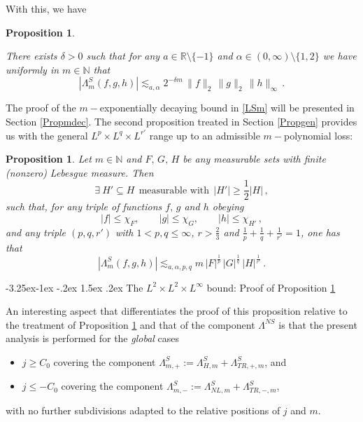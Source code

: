 \documentclass[a4paper,reqno]{amsart}
\makeatletter
\def\subsection{\@startsection{subsection}{2}{\z@}%
	{-3.25ex\@plus -1ex \@minus -.2ex}%
	{1.5ex \@plus .2ex}%
	{\normalfont\bfseries\boldmath}}
\numberwithin{equation}{section}
\newtheorem{proposition}[theorem]{Proposition}
\theoremstyle{definition}
\newcommand{\R}{\mathbb{R}}
\newcommand{\N}{\mathbb{N}}
\def\a{\alpha}
\def\d{\delta}
\def\L{\Lambda}
\makeatother
\begin{document}
With this, we have

\begin{proposition}\label{L2mdecay}

There exists $\d>0$ such that for any $a\in\R\setminus\{-1\}$ and $\a\in (0,\infty)\setminus\{1,2\}$ we have uniformly in $m\in\N$ that
\begin{equation}\label{LSm}
	|\L^S_{m}(f,g,h)|\lesssim_{a,\a} 2^{-\d m}\,\|f\|_2\,\|g\|_2\,\|h\|_{\infty}\,.
\end{equation}
\end{proposition}

The proof of the $m-$exponentially decaying bound in \eqref{LSm} will be presented in Section \ref{Propmdec}. The second proposition treated in Section \ref{Propgen} provides us with the general $L^p\times L^q\times L^{r'}$ range up to an admissible $m-$polynomial loss:

\begin{proposition}\label{Lgennodecay}
Let $m\in\N$ and $F,\,G,\,H$ be any measurable sets with finite (nonzero) Lebesgue measure. Then
\begin{equation}\label{Hprexist}
\exists\:H'\subseteq H\:\:\textrm{measurable with}\:\:|H'|\geq \frac{1}{2} |H|\,,
\end{equation}
such that, for any triple of functions $f,\,g$ and $h$ obeying
\begin{equation}\label{restrcitedweak}
|f|\leq \chi_{F},\qquad |g|\leq \chi_{G},\qquad |h|\leq \chi_{H'}\,,
\end{equation}
and any triple $(p,q,r')$ with $1<p,q\leq \infty$, $r>\frac{2}{3}$ and $\frac{1}{p}+\frac{1}{q}+\frac{1}{r'}=1$, one has that
\begin{equation}\label{goallsl1}
|\L^{S}_{m}(f,g,h)|\lesssim_{a,\a,p,q} m\, |F|^{\frac{1}{p}}\,|G|^{\frac{1}{q}}\,|H|^{\frac{1}{r'}}\,.
\end{equation}
\end{proposition}






\subsection{The $L^2\times L^2\times L^\infty$ bound: Proof of Proposition \ref{L2mdecay}}\label{Propmdec}

An interesting aspect that differentiates the proof of this proposition relative to the treatment of Proposition \ref{Lgennodecay} and that of the component $\L^{NS}$ is that the present analysis is performed for the \emph{global} cases
\begin{itemize}
\item $j\ge C_0$ covering the component $\L^{S}_{m,+}:=\L^{S}_{H,m}+\L^{S}_{TR,+,m}$, and

\item $j\le -C_0$ covering the component $\L^{S}_{m,-}:=\L^{S}_{NL,m}+\L^{S}_{TR,-,m}$,
\end{itemize}
with no further subdivisions adapted to the relative positions of $j$ and $m$.
\end{document}
